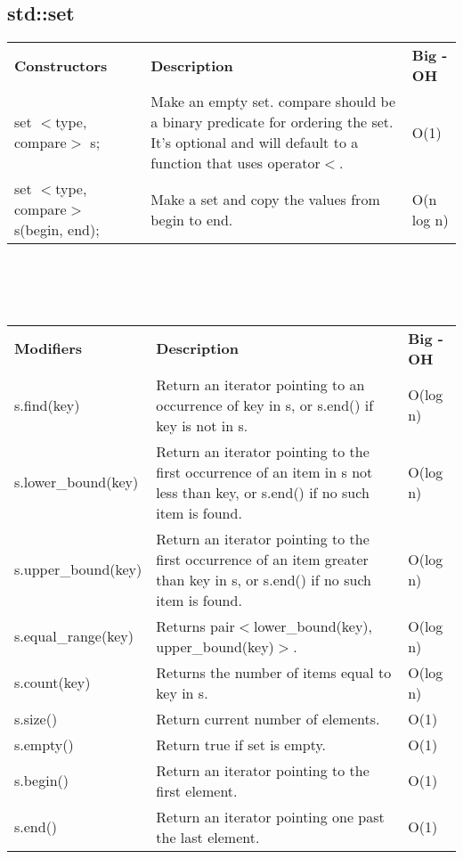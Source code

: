 \documentclass[12pt]{article}
\begin{document}
\subsection{std::set} \label{stdset}
\begin{tabular}{ p{5cm} p{7cm} p{5cm}}
\textbf{Constructors} & \textbf{Description} & \textbf{Big - OH}\\
set $<$type, compare$>$ s; & Make an empty set. compare should be a binary predicate for ordering the set. It's optional and will default to a function that uses operator$<$. & O(1)\\
set $<$type, compare$>$ s(begin, end); & Make a set and copy the values from begin to end. & O(n log n)
\end{tabular}
\\
\\
\\
\begin{tabular}{ p{5cm} p{7cm}  p{5cm}}
\textbf{Modifiers} & \textbf{Description} & \textbf{Big - OH}\\
s.find(key) & Return an iterator pointing to an occurrence of key in s, or s.end() if key is not in s. & O(log n)\\
s.lower\_bound(key) & Return an iterator pointing to the first occurrence of  an item in s not less than key, or s.end() if no such item is found. & O(log n)\\
s.upper\_bound(key) & Return an iterator pointing to the first occurrence of  an item greater than key in s, or s.end() if no such item is found. & O(log n)\\
s.equal\_range(key) & Returns pair$<$lower\_bound(key), upper\_bound(key)$>$. & O(log n)\\
s.count(key) & Returns the number of items equal to key in s. & O(log n)\\
s.size() & Return current number of elements. & O(1)\\
s.empty() & Return true if set is empty. & O(1)\\
s.begin() & Return an iterator pointing to the first element. & O(1)\\
s.end() & Return an iterator pointing one past the last element. & O(1)
\end{tabular}
\clearpage
\end{document}
